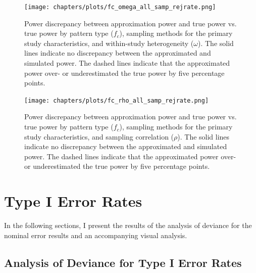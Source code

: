 \begin{figure}
    \centering
    \vspace{-5pt}\texttt{[image: chapters/plots/fc\_omega\_all\_samp\_rejrate.png]}\caption{Power discrepancy between approximation power and true power vs. true power by pattern type ($f_c$), sampling methods for the primary study characteristics, and within-study heterogeneity ($\omega$). The solid lines indicate no discrepancy between the approximated and simulated power. The dashed lines indicate that the approximated power over- or underestimated the true power by five percentage points.\label{fig: fc_omega_all_samp_rejrate}}
    \vspace{-5pt}
\end{figure}

\begin{figure}
    \centering
    \vspace{-5pt}\texttt{[image: chapters/plots/fc\_rho\_all\_samp\_rejrate.png]}\caption{Power discrepancy between approximation power and true power vs. true power by pattern type ($f_c$), sampling methods for the primary study characteristics, and sampling correlation ($\rho$). The solid lines indicate no discrepancy between the approximated and simulated power. The dashed lines indicate that the approximated power over- or underestimated the true power by five percentage points. \label{fig: fc_rho_all_samp_rejrate}}
    \vspace{-5pt}
\end{figure}

\section{Type I Error Rates}

In the following sections, I present the results of the analysis of deviance for the nominal error results and an accompanying visual analysis.

\subsection{Analysis of Deviance for Type I Error Rates}

